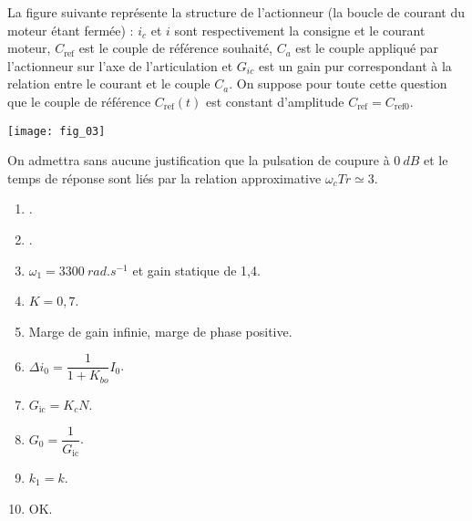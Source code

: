 \begin{multicols}{2}
La figure suivante représente la structure de l’actionneur (la boucle de courant du moteur étant fermée) : $i_c$ et $i$
sont respectivement la consigne et le courant moteur, $C_{\text{ref}}$ est le couple de référence souhaité, $C_a$ est le couple
appliqué par l’actionneur sur l’axe de l’articulation et $G_{ic}$ est un gain pur correspondant à la relation entre le
courant et le couple $C_a$. On suppose pour toute cette question que le couple de référence $C_{\text{ref}} (t)$ est constant
d’amplitude $C_{\text{ref}} = C_{\text{ref0}}$.


\begin{center}
\texttt{[image: fig\_03]}
\end{center}

\ifprof
\begin{corrige}
\end{corrige}
\else
\fi


\ifprof
\begin{corrige}
\end{corrige}
\else
\fi

\ifprof
\begin{corrige}
\end{corrige}
\else
\fi


\ifprof
\begin{corrige}
\end{corrige}
\else
\fi

On admettra sans aucune justification que la pulsation de coupure à $\SI{0}{dB}$ et le temps de réponse sont liés par la relation approximative $\omega_cTr \simeq 3$.

\footnotesize
\begin{enumerate}
\item .
\item .
\item $\omega_1 = \SI{3300}{rad.s^{-1}}$ et gain statique de 1,4.
\item $K = 0,7$.
\item Marge de gain infinie, marge de phase positive.
\item $\Delta i_0 = \dfrac{1}{1+K_{bo}}I_0$.
\item $G_{\text{ic}} = K_c N$.
\item $G_0 = \dfrac{1}{G_{\text{ic}}}$.
\item $k_1 = k$.
\item OK.
\end{enumerate}
\normalsize


\end{multicols}
